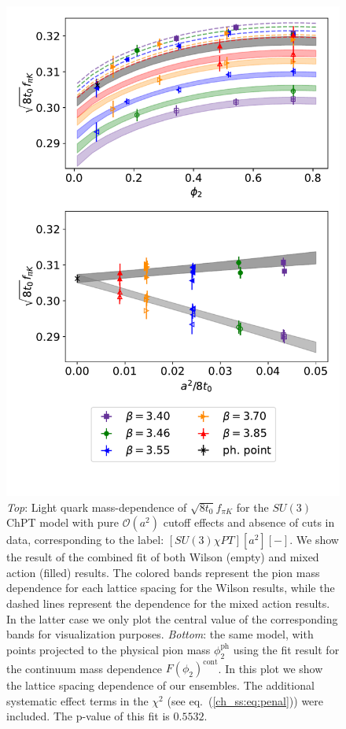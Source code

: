 \begin{figure}
    \centering
    \includegraphics[width=1.\textwidth, angle=0]{./cap5/figs/SU3_comb.pdf}
    \caption{\textit{Top}: Light quark mass-dependence of $\sqrt{8t_0}f_{\pi K}$ for the $SU(3)$ ChPT model with pure $\mathcal{O}(a^2)$ cutoff effects and absence of cuts in data, corresponding to the label: $[SU(3)\chi PT][a^2][-]$. We show the result of the combined fit of both Wilson (empty) and mixed action (filled) results. The colored bands represent the pion mass dependence for each lattice spacing for the Wilson results, while the dashed lines represent the dependence for the mixed action results. In the latter case we only plot the central value of the corresponding bands for visualization purposes. \textit{Bottom}: the same model, with points projected to the physical pion mass $\phi_2^{\textrm{ph}}$ using the fit result for the continuum mass dependence $F(\phi_2)^{\textrm{cont}}$. In this plot we show the lattice spacing dependence of our ensembles. The  additional systematic effect terms in the $\chi^2$ (see eq.~(\ref{ch_ss:eq:penal})) were included. The p-value of this fit is $0.5532$.}
    \label{ch_ss:fig:SU3a2}
\end{figure}

